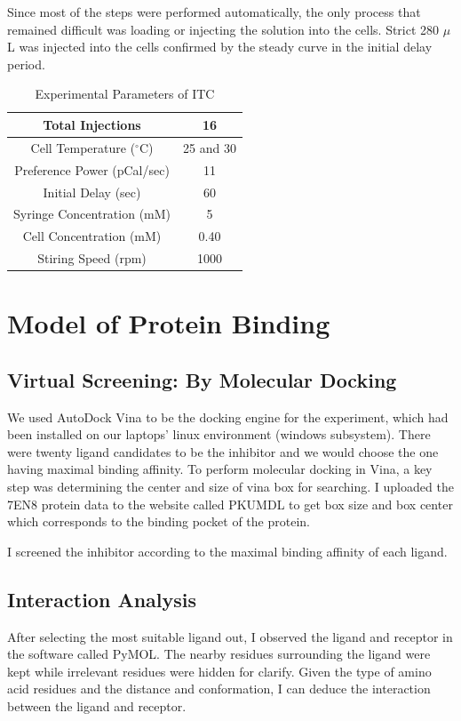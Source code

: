 \documentclass{report}
\begin{document}
Since most of the steps were performed automatically, the only process that remained difficult was loading or injecting the solution into the cells.
Strict 280 $\mu$L was injected into the cells confirmed by the steady curve in the initial delay period.
\begin{table}
    \centering
    \caption{Experimental Parameters of ITC}
    \label{Experimental Parameters of ITC}
    \begin{tabular}{|c|c|}
        \toprule
        Total Injections & 16 \\
        \midrule
        Cell Temperature ($^\circ$C) & 25 and 30 \\
        Preference Power (pCal/sec) & 11 \\
        Initial Delay (sec) & 60 \\
        Syringe Concentration (mM) & 5 \\
        Cell Concentration (mM) & 0.40 \\
        Stiring Speed (rpm) & 1000 \\
        \bottomrule
    \end{tabular}
        
        
\end{table}
\section{Model of Protein Binding}
\subsection{Virtual Screening: By Molecular Docking}
We used AutoDock Vina to be the docking engine for the experiment, which had been installed on our laptops' linux environment (windows subsystem).
There were twenty ligand candidates to be the inhibitor and we would choose the one having maximal binding affinity.
To perform molecular docking in Vina, a key step was determining the center and size of vina box for searching.
I uploaded the 7EN8 protein data to the website called PKUMDL\cite{pkumdl} to get box size and box center which corresponds to the binding pocket of the protein.

I screened the inhibitor according to the maximal binding affinity of each ligand.

\subsection{Interaction Analysis}
After selecting the most suitable ligand out, I observed the ligand and receptor in the software called PyMOL.
The nearby residues surrounding the ligand were kept while irrelevant residues were hidden for clarify.
Given the type of amino acid residues and the distance and conformation, I can deduce the interaction between the ligand and receptor.
\end{document}
